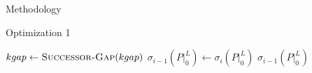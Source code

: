 \documentclass{article}
\begin{document}
\begin{section}{Methodology}
\begin{subsection}{Optimization 1}
\begin{paragraph}{}
\begin{algorithm}[H]
\begin{algorithmic}[2]
                  \ExitWhile
                \EndIf
                      \State \Call{Gap-Insert}{$\sigma_{i}(P|_{0}^{L}), [t_{1},t)$}
                    \NewEndIf
                  \State \Call{Gap-Insert}{$\sigma_{i}(P|_{0}^{L}), [t + C_{j},t_{2})$}
                  \ExitWhile
                \EndIf
                    \State \Call{Gap-Insert}{$\sigma_{i}(P|_{0}^{L}), [t_{1},t)$}
                  \NewEndIf
                \EndIf
              \EndIf
                \State $kgap \gets \Call{Successor-Gap}{kgap}$
              \EndIf
            \EndWhile
          \EndFor
          \State $\sigma_{i-1}(P|_{0}^{L}) \gets \sigma_{i}(P|_{0}^{L})$
          \State \Return $\sigma_{i-1}(P|_{0}^{L})$
        \EndFunction
      \end{algorithmic}
    \end{algorithm}
    \end{paragraph}
  \end{subsection}


\end{section}
\end{document}
